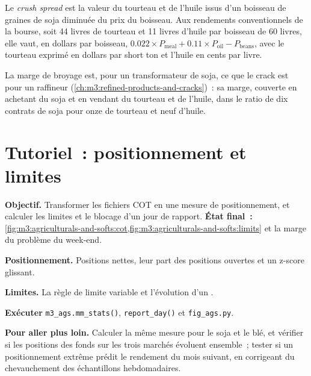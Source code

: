 \begin{definition}\label{def:m3:agriculturals-and-softs:crush}
Le \emph{crush spread} est la valeur du tourteau et de l'huile issus d'un boisseau de graines de soja
diminuée du prix du boisseau. Aux rendements conventionnels de la bourse, soit 44 livres de tourteau et 11 livres
d'huile par boisseau de 60 livres, elle vaut, en dollars par boisseau,
$0.022 \times P_{\mathrm{meal}} + 0.11 \times P_{\mathrm{oil}} - P_{\mathrm{beans}}$, avec le tourteau exprimé en dollars
par short ton et l'huile en cents par livre.
\end{definition}

La marge de broyage est, pour un transformateur de soja, ce que le crack est pour un raffineur
(\cref{ch:m3:refined-products-and-cracks})~: sa marge, couverte en achetant du soja et en vendant du tourteau et de l'huile,
dans le ratio de dix contrats de soja pour onze de tourteau et neuf d'huile.

\section{Tutoriel~: positionnement et limites}\label{tut:m3:agriculturals-and-softs:cot}

\begin{tutorial}
\textbf{Objectif.} Transformer les fichiers COT en une mesure de positionnement, et calculer les limites et le blocage
d'un jour de rapport. \textbf{État final~:}
\cref{fig:m3:agriculturals-and-softs:cot,fig:m3:agriculturals-and-softs:limits} et la marge du
problème du week-end.
\begin{tutsteps}
\item \textbf{Positionnement.} Positions nettes, leur part des positions ouvertes et un z-score glissant.
\label{lst:m3:agriculturals-and-softs:cot}
\item \textbf{Limites.} La règle de limite variable et l'évolution d'un .
\label{lst:m3:agriculturals-and-softs:limits}
\item \textbf{Exécuter} \texttt{m3\_ags.mm\_stats()}, \texttt{report\_day()} et \texttt{fig\_ags.py}.
\end{tutsteps}
\textbf{Pour aller plus loin.} Calculer la même mesure pour le soja et le blé, et vérifier si les positions des fonds
sur les trois marchés évoluent ensemble~; tester si un positionnement extrême prédit le rendement du mois suivant,
en corrigeant du chevauchement des échantillons hebdomadaires.
\end{tutorial}

